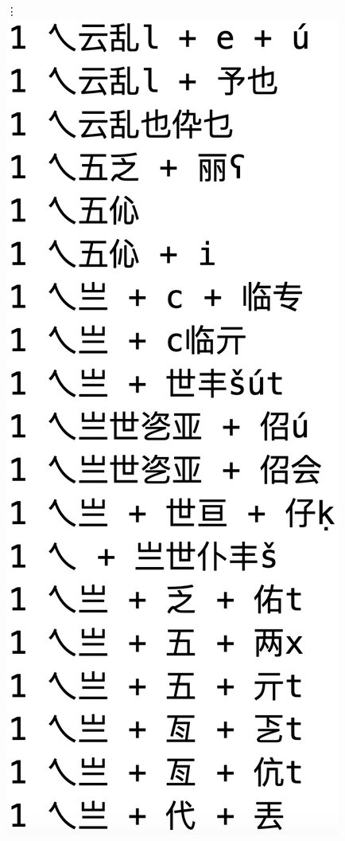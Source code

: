 {\begin{figure}[t]
\begin{mdframed}
\vdots \vspace{6pt}
\includegraphics[scale=0.3]{output-from-morfessor-0} \\

\end{mdframed}
\end{figure}}
